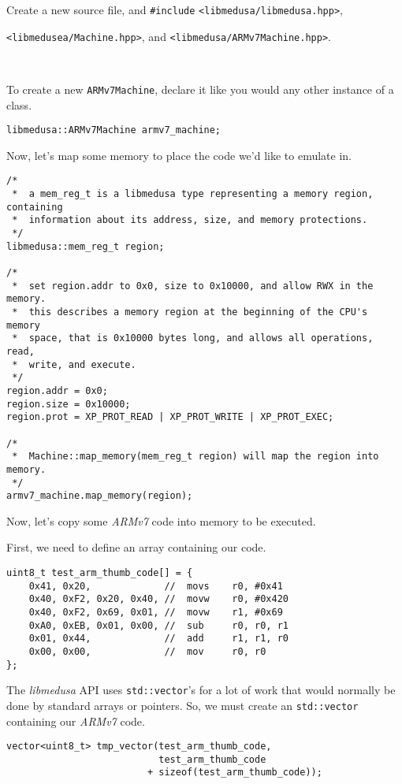 \documentclass{report}
\begin{document}
	Create a new source file, and \texttt{\#include}
	\texttt{<libmedusa/libmedusa.hpp>}, \

	\texttt{<libmedusea/Machine.hpp>}, and \texttt{<libmedusa/ARMv7Machine.hpp>}.
	\
	
	\

	To create a new \texttt{ARMv7Machine}, declare it like you would any other
	instance of a class.

	\begin{lstlisting}
libmedusa::ARMv7Machine armv7_machine;
	\end{lstlisting}

	Now, let's map some memory to place the code we'd like to emulate in.

	\begin{lstlisting}
/*
 *  a mem_reg_t is a libmedusa type representing a memory region, containing
 *  information about its address, size, and memory protections.
 */
libmedusa::mem_reg_t region;

/*
 *  set region.addr to 0x0, size to 0x10000, and allow RWX in the memory.
 *  this describes a memory region at the beginning of the CPU's memory
 *  space, that is 0x10000 bytes long, and allows all operations, read,
 *  write, and execute.
 */
region.addr = 0x0;
region.size = 0x10000;
region.prot = XP_PROT_READ | XP_PROT_WRITE | XP_PROT_EXEC;

/*
 *  Machine::map_memory(mem_reg_t region) will map the region into memory.
 */
armv7_machine.map_memory(region);
\end{lstlisting}

	Now, let's copy some \textit{ARMv7} code into memory to be executed.

	First, we need to define an array containing our code.

	\begin{lstlisting}
uint8_t test_arm_thumb_code[] = {
	0x41, 0x20,				//	movs	r0,	#0x41
	0x40, 0xF2, 0x20, 0x40,	//	movw	r0,	#0x420
	0x40, 0xF2, 0x69, 0x01,	//	movw	r1,	#0x69
	0xA0, 0xEB, 0x01, 0x00,	//	sub		r0,	r0,	r1
	0x01, 0x44,				//	add		r1,	r1,	r0
	0x00, 0x00,				//  mov		r0,	r0
};
	\end{lstlisting}

	The \textit{libmedusa} API uses \texttt{std::vector}'s for a lot of work
	that would normally be done by standard arrays or pointers. So, we must
	create an \texttt{std::vector} containing our \textit{ARMv7} code.

	\begin{lstlisting}
vector<uint8_t> tmp_vector(test_arm_thumb_code,
						   test_arm_thumb_code
						 + sizeof(test_arm_thumb_code));
	\end{lstlisting}
\end{document}
